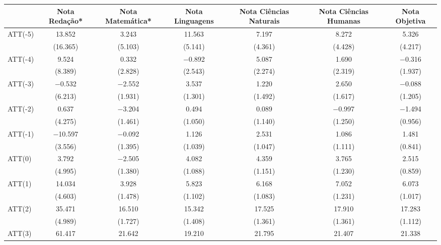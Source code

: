 \begin{table}
\centering
\begin{tabular}[t]{lcccccc}
\toprule
  & Nota Redação* & Nota Matemática* & Nota Linguagens & Nota Ciências Naturais & Nota Ciências Humanas & Nota Objetiva\\
\midrule
ATT(-5) & \num{13.852} & \num{3.243} & \num{11.563} & \num{7.197} & \num{8.272} & \num{5.326}\\
 & (\num{16.365}) & (\num{5.103}) & (\num{5.141}) & (\num{4.361}) & (\num{4.428}) & (\num{4.217})\\
ATT(-4) & \num{9.524} & \num{0.332} & \num{-0.892} & \num{5.087} & \num{1.690} & \num{-0.316}\\
 & (\num{8.389}) & (\num{2.828}) & (\num{2.543}) & (\num{2.274}) & (\num{2.319}) & (\num{1.937})\\
ATT(-3) & \num{-0.532} & \num{-2.552} & \num{3.537} & \num{1.220} & \num{2.650} & \num{-0.088}\\
 & (\num{6.213}) & (\num{1.931}) & (\num{1.301}) & (\num{1.492}) & (\num{1.617}) & (\num{1.205})\\
ATT(-2) & \num{0.637} & \num{-3.204} & \num{0.494} & \num{0.089} & \num{-0.997} & \num{-1.494}\\
 & (\num{4.275}) & (\num{1.461}) & (\num{1.050}) & (\num{1.140}) & (\num{1.250}) & (\num{0.956})\\
ATT(-1) & \num{-10.597} & \num{-0.092} & \num{1.126} & \num{2.531} & \num{1.086} & \num{1.481}\\
 & (\num{3.556}) & (\num{1.395}) & (\num{1.039}) & (\num{1.047}) & (\num{1.111}) & (\num{0.841})\\
ATT(0) & \num{3.792} & \num{-2.505} & \num{4.082} & \num{4.359} & \num{3.765} & \num{2.515}\\
 & (\num{4.995}) & (\num{1.380}) & (\num{1.088}) & (\num{1.151}) & (\num{1.230}) & (\num{0.859})\\
ATT(1) & \num{14.034} & \num{3.928} & \num{5.823} & \num{6.168} & \num{7.052} & \num{6.073}\\
 & (\num{4.603}) & (\num{1.478}) & (\num{1.102}) & (\num{1.083}) & (\num{1.231}) & (\num{1.017})\\
ATT(2) & \num{35.471} & \num{16.510} & \num{15.342} & \num{17.525} & \num{17.910} & \num{17.283}\\
 & (\num{4.989}) & (\num{1.727}) & (\num{1.408}) & (\num{1.361}) & (\num{1.361}) & (\num{1.112})\\
ATT(3) & \num{61.417} & \num{21.642} & \num{19.210} & \num{21.795} & \num{21.407} & \num{21.338}\\

\end{tabular}
\end{table}
